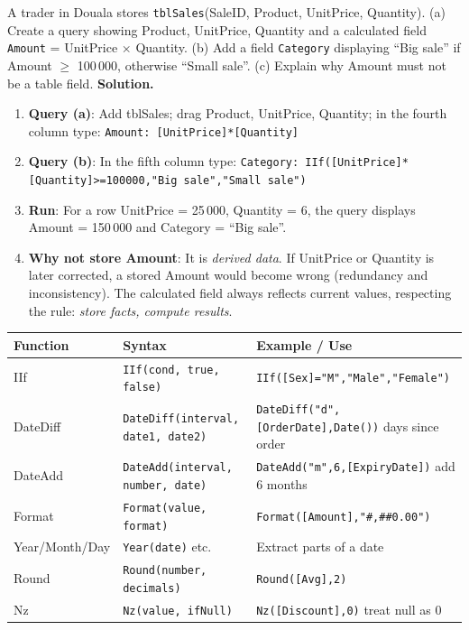 \documentclass[11pt]{article}
\begin{document}
\begin{exoresolu}
A trader in Douala stores \texttt{tblSales}(SaleID, Product, UnitPrice, Quantity). (a) Create a query showing Product, UnitPrice, Quantity and a calculated field \texttt{Amount} = UnitPrice $\times$ Quantity. (b) Add a field \texttt{Category} displaying ``Big sale'' if Amount $\geq$ 100\,000, otherwise ``Small sale''. (c) Explain why Amount must not be a table field.
\tcblower
\textbf{Solution.}
\begin{enumerate}
\item \textbf{Query (a)}: Add tblSales; drag Product, UnitPrice, Quantity; in the fourth column type:
\texttt{Amount: [UnitPrice]*[Quantity]}
\item \textbf{Query (b)}: In the fifth column type:
\texttt{Category: IIf([UnitPrice]*[Quantity]>=100000,"Big sale","Small sale")}
\item \textbf{Run}: For a row UnitPrice = 25\,000, Quantity = 6, the query displays Amount = 150\,000 and Category = ``Big sale''.
\item \textbf{Why not store Amount}: It is \emph{derived data}. If UnitPrice or Quantity is later corrected, a stored Amount would become wrong (redundancy and inconsistency). The calculated field always reflects current values, respecting the rule: \emph{store facts, compute results}.
\end{enumerate}
\end{exoresolu}

\begin{exemplebox}
\begin{center}
\begin{tabularx}{\linewidth}{|l|l|X|}
\hline
\rowcolor{popblueL} \textbf{Function} & \textbf{Syntax} & \textbf{Example / Use} \\
\hline
IIf & \texttt{IIf(cond, true, false)} & \texttt{IIf([Sex]="M","Male","Female")} \\
DateDiff & \texttt{DateDiff(interval, date1, date2)} & \texttt{DateDiff("d",[OrderDate],Date())} days since order \\
DateAdd & \texttt{DateAdd(interval, number, date)} & \texttt{DateAdd("m",6,[ExpiryDate])} add 6 months \\
Format & \texttt{Format(value, format)} & \texttt{Format([Amount],"\#,\#\#0.00")} \\
Year/Month/Day & \texttt{Year(date)} etc. & Extract parts of a date \\
Round & \texttt{Round(number, decimals)} & \texttt{Round([Avg],2)} \\
Nz & \texttt{Nz(value, ifNull)} & \texttt{Nz([Discount],0)} treat null as 0 \\
\hline
\end{tabularx}
\end{center}
\end{exemplebox}
\end{document}
